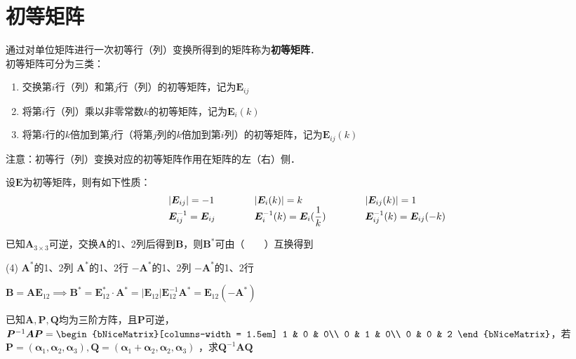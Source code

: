 \documentclass[12pt, a4paper, oneside, UTF8]{ctexbook}
\begin{document}
\section{初等矩阵}
\begin{definition}
    通过对单位矩阵进行一次初等行（列）变换所得到的矩阵称为\textbf{初等矩阵}．\\
    初等矩阵可分为三类：
    \begin{enumerate}[label = (\arabic*)]
        \item 交换第$i$行（列）和第$j$行（列）的初等矩阵，记为$\bm{E}_{ij}$
        \item 将第$i$行（列）乘以非零常数$k$的初等矩阵，记为$\bm{E}_{i}(k)$
        \item 将第$i$行的$k$倍加到第$j$行（将第$j$列的$k$倍加到第$i$列）的初等矩阵，记为$\bm{E}_{ij}(k)$
    \end{enumerate}
    注意：初等行（列）变换对应的初等矩阵作用在矩阵的左（右）侧．
\end{definition}
\begin{theorem}
    设$\bm{E}$为初等矩阵，则有如下性质：
    \[
        \begin{array}{l@{\qquad\qquad}l@{\qquad\qquad}l}
            |\bm{E}_{ij}| = -1 & |\bm{E}_{i}(k)| = k & |\bm{E}_{ij}(k)| = 1 \\
             \bm{E}_{ij}^{-1} = \bm{E}_{ij} & \bm{E}_{i}^{-1}(k) = \bm{E}_{i}(\dfrac{1}{k}) &\bm{E}_{ij}^{-1}(k) = \bm{E}_{ij}(-k)
        \end{array}
    \]
\end{theorem}
\begin{example}
    已知$\bm{A}_{3\times 3}$可逆，交换$\bm{A}$的1、2列后得到$\bm{B}$，则$\bm{B}^*$可由（　　）互换得到
    \begin{tasks}[style = itemize,label = \Alph*.](4)
        \task $\bm{A}^*$的1、2列
        \task $\bm{A}^*$的1、2行
        \task $-\bm{A}^*$的1、2列
        \task $-\bm{A}^*$的1、2行
    \end{tasks}
\end{example}
\begin{solution}
    $\bm{B} = \bm{A}\bm{E}_{12} \implies \bm{B}^* = \bm{E}_{12}^*\cdot \bm{A}^* = |\bm{E}_{12}|\bm{E}_{12}^{-1}\bm{A}^* = \bm{E}_{12}(-\bm{A}^*)$
\end{solution}
\begin{example}
    已知$\bm{A},\bm{P},\bm{Q}$均为三阶方阵，且$\bm{P}$可逆，$\bm{P}^{-1}\bm{A}\bm{P} = \begin{bNiceMatrix}[columns-width = 1.5em]
        1 & 0 & 0\\
        0 & 1 & 0\\
        0 & 0 & 2
    \end{bNiceMatrix}
    $，若$\bm{P}=(\bm{\alpha}_1, \bm{\alpha}_2, \bm{\alpha}_3),\bm{Q}=(\bm{\alpha}_1+\bm{\alpha}_2, \bm{\alpha}_2, \bm{\alpha}_3)$
    ，求$\bm{Q}^{-1}\bm{A}\bm{Q}$
\end{example}
\end{document}
